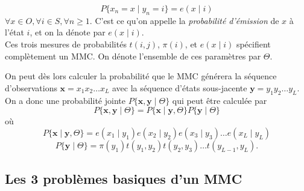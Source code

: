 \documentclass[a4paper, 11pt]{article}
\begin{document}
\begin{equation}
P\{x_n=x\mid y_n=i\}=e(x\mid i)
\end{equation}
$\forall x\in O,\forall i\in S,\forall n\geq 1$. C'est ce qu'on appelle la \textit{probabilité d'émission} de $x$ à l'état $i$, et on la dénote par $e(x\mid i)$. 
\\
Ces trois mesures de probabilités $t(i,j)$, $\pi (i)$, et $e(x\mid i)$ spécifient complètement un MMC. On dénote l'ensemble de ces paramètres par $\Theta$.
\\
\par
On peut dès lors calculer la probabilité que le MMC générera la séquence d'observations $\textbf{x} = x_1x_2\dotsc x_L $  avec la séquence d'états sous-jacente $\textbf{y} = y_1y_2\dotsc y_L $. On a donc une probabilité jointe $P\{\textbf{x},\textbf{y}\mid \Theta\}$ qui peut être calculée par
\begin{equation}
P\{\textbf{x},\textbf{y}\mid \Theta\} = P\{\textbf{x}\mid \textbf{y},\Theta\}P\{\textbf{y}\mid \Theta\}
\end{equation}
où
\begin{equation}
P\{\textbf{x}\mid \textbf{y},\Theta\} = e(x_1\mid y_1)e(x_2\mid y_2)e(x_3\mid y_3)\dotsc e(x_L\mid y_L)
\end{equation}
\begin{equation}
P\{\textbf{y}\mid \Theta\} = \pi(y_1)t(y_1,y_2)t(y_2,y_3)\dotsc t(y_{L-1},y_L).
\end{equation}
\newpage
\subsection{Les 3 problèmes basiques d'un MMC}
\end{document}
